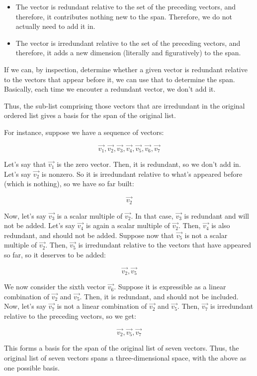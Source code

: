 \documentclass[10pt]{amsart}
\begin{document}
\begin{itemize}
\item The vector is redundant relative to the set of the preceding
  vectors, and therefore, it contributes nothing new to the
  span. Therefore, we do not actually need to add it in.
\item The vector is irredundant relative to the set of the preceding
  vectors, and therefore, it adds a new dimension (literally and
  figuratively) to the span.
\end{itemize}

If we can, by inspection, determine whether a given vector is
redundant relative to the vectors that appear before it, we can use
that to determine the span. Basically, each time we encouter a
redundant vector, we don't add it.

Thus, the sub-list comprising those vectors that are irredundant in
the original ordered list gives a basis for the span of the original
list.

For instance, suppose we have a sequence of vectors:

$$\vec{v_1}, \vec{v_2}, \vec{v_3}, \vec{v_4}, \vec{v_5},\vec{v_6},\vec{v_7}$$

Let's say that $\vec{v_1}$ is the zero vector. Then, it is redundant,
so we don't add in. Let's say $\vec{v_2}$ is nonzero. So it is
irredundant relative to what's appeared before (which is nothing), so
we have so far built:

$$\vec{v_2}$$

Now, let's say $\vec{v_3}$ is a scalar multiple of $\vec{v_2}$. In
that case, $\vec{v_3}$ is redundant and will not be added. Let's say
$\vec{v_4}$ is again a scalar multiple of $\vec{v_2}$. Then,
$\vec{v_4}$ is also redundant, and should not be added. Suppose now
that $\vec{v_5}$ is not a scalar multiple of $\vec{v_2}$. Then,
$\vec{v_5}$ is irredundant relative to the vectors that have appeared
so far, so it deserves to be added:

$$\vec{v_2},\vec{v_5}$$

We now consider the sixth vector $\vec{v_6}$. Suppose it is
expressible as a linear combination of $\vec{v_2}$ and
$\vec{v_5}$. Then, it is redundant, and should not be included. Now,
let's say $\vec{v_7}$ is not a linear combination of $\vec{v_2}$ and
$\vec{v_5}$. Then, $\vec{v_7}$ is irredundant relative to the
preceding vectors, so we get:

$$\vec{v_2}, \vec{v_5}, \vec{v_7}$$

This forms a basis for the span of the original list of seven
vectors. Thus, the original list of seven vectors spans a
three-dimensional space, with the above as one possible basis.
\end{document}
